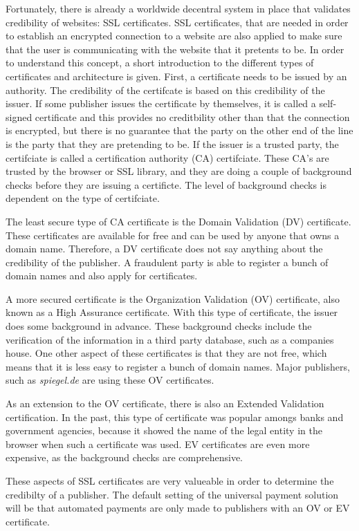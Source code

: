 Fortunately, there is already a worldwide decentral system in place that validates credibility of websites: SSL certificates. SSL certificates, that are needed in order to establish an encrypted connection to a website are also applied to make sure that the user is communicating with the website that it pretents to be. In order to understand this concept, a short introduction to the different types of certificates and architecture is given. First, a certificate needs to be issued by an authority. The credibility of the certifcate is based on this credibility of the issuer. If some publisher issues the certificate by themselves, it is called a self-signed certificate and this provides no creditbility other than that the connection is encrypted, but there is no guarantee that the party on the other end of the line is the party that they are pretending to be. If the issuer is a trusted party, the certifciate is called a certification authority (CA) certifciate. These CA's are trusted by the browser or SSL library, and they are doing a couple of background checks before they are issuing a certificte. The level of background checks is dependent on the type of certifciate. 

The least secure type of CA certificate is the Domain Validation (DV) certificate. These certificates are available for free and can be used by anyone that owns a domain name. Therefore, a DV certificate does not say anything about the credibility of the publisher. A fraudulent party is able to register a bunch of domain names and also apply for certificates.

A more secured certificate is the Organization Validation (OV) certificate, also known as a High Assurance certificate. With this type of certificate, the issuer does some background in advance. These background checks include the verification of the information in a third party database, such as a companies house. One other aspect of these certificates is that they are not free, which means that it is less easy to register a bunch of domain names. Major publishers, such as \textit{spiegel.de} are using these OV certificates.

As an extension to the OV certificate, there is also an Extended Validation certification. In the past, this type of certificate was popular amongs banks and government agencies, because it showed the name of the legal entity in the browser when such a certificate was used. EV certificates are even more expensive, as the background checks are comprehensive.

These aspects of SSL certificates are very valueable in order to determine the credibilty of a publisher. The default setting of the universal payment solution will be that automated payments are only made to publishers with an OV or EV certificate.


